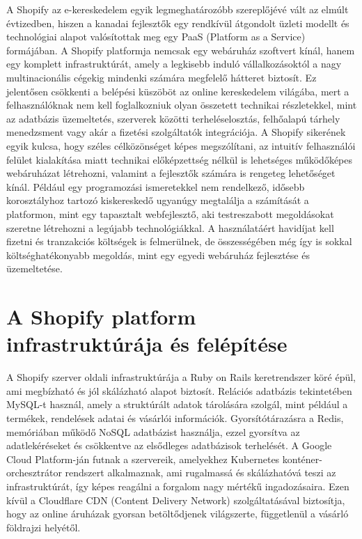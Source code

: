 \documentclass[12pt]{report}
\begin{document}
        A Shopify az e-kereskedelem egyik legmeghatározóbb szereplőjévé vált az elmúlt évtizedben, hiszen a kanadai fejlesztők egy rendkívül átgondolt üzleti modellt és technológiai alapot valósítottak meg egy PaaS (Platform as a Service) formájában. A Shopify platformja nemcsak egy webáruház szoftvert kínál, hanem egy komplett infrastruktúrát, amely a legkisebb induló vállalkozásoktól a nagy multinacionális cégekig mindenki számára megfelelő hátteret biztosít. Ez jelentősen csökkenti a belépési küszöböt az online kereskedelem világába, mert a felhasználóknak nem kell foglalkozniuk olyan összetett technikai részletekkel, mint az adatbázis üzemeltetés, szerverek közötti terheléselosztás, felhőalapú tárhely menedzsment vagy akár a fizetési szolgáltatók integrációja. A Shopify sikerének egyik kulcsa, hogy széles célközönséget képes megszólítani, az intuitív felhasználói felület kialakítása miatt technikai előképzettség nélkül is lehetséges működőképes webáruházat létrehozni, valamint a fejlesztők számára is rengeteg lehetőséget kínál. Például egy programozási ismeretekkel nem rendelkező, idősebb korosztályhoz tartozó kiskereskedő ugyanúgy megtalálja a számítását a platformon, mint egy tapasztalt webfejlesztő, aki testreszabott megoldásokat szeretne létrehozni a legújabb technológiákkal. A használatáért havidíjat kell fizetni és tranzakciós költségek is felmerülnek, de összességében még így is sokkal költséghatékonyabb megoldás, mint egy egyedi webáruház fejlesztése és üzemeltetése.
        
        \section{A Shopify platform infrastruktúrája és felépítése}

        A Shopify szerver oldali infrastruktúrája a Ruby on Rails keretrendszer köré épül, ami megbízható és jól skálázható alapot biztosít. Relációs adatbázis tekintetében MySQL-t használ, amely a struktúrált adatok tárolására szolgál, mint például a termékek, rendelések adatai és vásárlói információk. Gyorsítótárazásra a Redis, memóriában működő NoSQL adatbázist használja, ezzel gyorsítva az adatlekéréseket és csökkentve az elsődleges adatbázisok terhelését. A Google Cloud Platform-ján futnak a szervereik, amelyekhez Kubernetes konténer-orchesztrátor rendszert alkalmaznak, ami rugalmassá és skálázhatóvá teszi az infrastruktúrát, így képes reagálni a forgalom nagy mértékű ingadozásaira. Ezen kívül a Cloudflare CDN (Content Delivery Network) szolgáltatásával biztosítja, hogy az online áruházak gyorsan betöltődjenek világszerte, függetlenül a vásárló földrajzi helyétől. 
        
\end{document}
